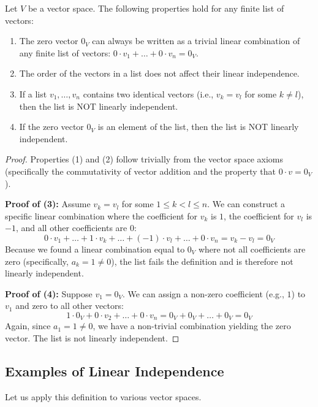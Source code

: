 \begin{lemma}
Let $V$ be a vector space. The following properties hold for any finite list of vectors:
\begin{enumerate}
    \item The zero vector $0_V$ can always be written as a trivial linear combination of any finite list of vectors: $0 \cdot v_1 + \dots + 0 \cdot v_n = 0_V$.
    \item The order of the vectors in a list does not affect their linear independence.
    \item If a list $v_1, \dots, v_n$ contains two identical vectors (i.e., $v_k = v_l$ for some $k \ne l$), then the list is NOT linearly independent.
    \item If the zero vector $0_V$ is an element of the list, then the list is NOT linearly independent.
\end{enumerate}
\end{lemma}

\begin{proof}
Properties (1) and (2) follow trivially from the vector space axioms (specifically the commutativity of vector addition and the property that $0 \cdot v = 0_V$).

\textbf{Proof of (3):} Assume $v_k = v_l$ for some $1 \le k < l \le n$. We can construct a specific linear combination where the coefficient for $v_k$ is $1$, the coefficient for $v_l$ is $-1$, and all other coefficients are $0$:
\[
0 \cdot v_1 + \dots + 1 \cdot v_k + \dots + (-1) \cdot v_l + \dots + 0 \cdot v_n = v_k - v_l = 0_V
\]
Because we found a linear combination equal to $0_V$ where not all coefficients are zero (specifically, $a_k = 1 \ne 0$), the list fails the definition and is therefore not linearly independent.

\textbf{Proof of (4):} Suppose $v_1 = 0_V$. We can assign a non-zero coefficient (e.g., $1$) to $v_1$ and zero to all other vectors:
\[
1 \cdot 0_V + 0 \cdot v_2 + \dots + 0 \cdot v_n = 0_V + 0_V + \dots + 0_V = 0_V
\]
Again, since $a_1 = 1 \ne 0$, we have a non-trivial combination yielding the zero vector. The list is not linearly independent.
\end{proof}

\subsection{Examples of Linear Independence}

Let us apply this definition to various vector spaces.

